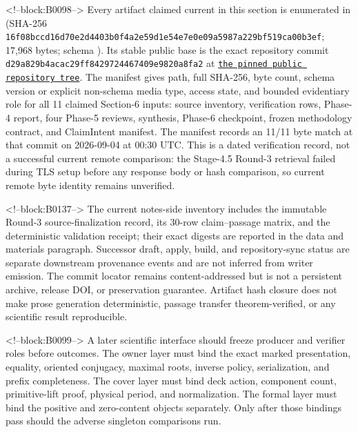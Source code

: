 \documentclass[11pt]{article}
\begin{document}
<!--block:B0098-->
\begingroup\sloppy
Every artifact claimed current in this section is enumerated in
 (SHA-256
\texttt{16f08bcc\allowbreak{}d16d70e2\allowbreak{}d4403b0f\allowbreak{}4a2e59d1\allowbreak{}e54e7e0e\allowbreak{}09a5987a\allowbreak{}229bf519\allowbreak{}ca00b3ef}; 17,968 bytes; schema
).  Its stable public
base is the exact repository commit
\texttt{d29a829b\allowbreak{}4acac29f\allowbreak{}f8429724\allowbreak{}467409e9\allowbreak{}820a8fa2} at
\href{https://github.com/maris205/hilbert-polya-structure/tree/d29a829b4acac29ff8429724467409e9820a8fa2/flow_systems/papers/32-homology-cover-renormalization-uniformity}{\texttt{the pinned public repository tree}}.
The manifest gives path, full SHA-256, byte count, schema version or explicit
non-schema media type, access state, and bounded evidentiary role for all 11
claimed Section-6 inputs: source inventory, verification rows, Phase-4 report,
four Phase-5 reviews, synthesis, Phase-6 checkpoint, frozen methodology
contract, and ClaimIntent manifest.  The manifest records an 11/11 byte match at that commit on
2026-09-04 at 00:30 UTC. This is a dated verification record, not a
successful current remote comparison: the Stage-4.5 Round-3 retrieval
failed during TLS setup before any response body or hash comparison, so
current remote byte identity remains unverified.

<!--block:B0137-->
The current notes-side inventory includes the immutable
Round-3 source-finalization record, its 30-row claim--passage matrix, and the
deterministic validation receipt; their exact digests are reported in the data and
materials paragraph. Successor draft, apply, build, and repository-sync status are
separate downstream provenance events and are not inferred from writer emission.
The commit locator remains content-addressed but is not a persistent archive,
release DOI, or preservation guarantee. Artifact hash closure does not make prose
generation deterministic, passage transfer theorem-verified, or any scientific
result reproducible.
\par\endgroup

<!--block:B0099-->
A later scientific interface should freeze producer and verifier roles
before outcomes. The owner layer must bind the exact marked
presentation, equality, oriented conjugacy, maximal roots, inverse
policy, serialization, and prefix completeness. The cover layer must
bind deck action, component count, primitive-lift proof, physical
period, and normalization. The formal layer must bind the positive and
zero-content objects separately. Only after those bindings pass should
the adverse singleton comparisons run.
\end{document}
